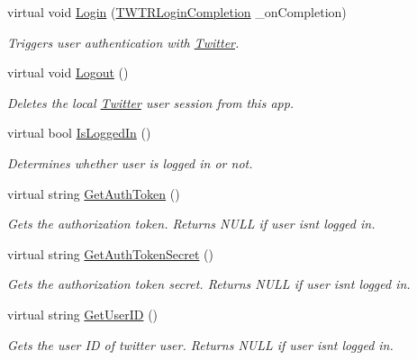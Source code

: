 \begin{DoxyCompactItemize}
\item 
virtual void \hyperlink{class_voxel_busters_1_1_native_plugins_1_1_twitter_a9949714add72302695128d30d824f7a7}{Login} (\hyperlink{class_voxel_busters_1_1_native_plugins_1_1_twitter_a34f959f59508d1442e3d921bbfe45cd5}{T\+W\+T\+R\+Login\+Completion} \+\_\+on\+Completion)
\begin{DoxyCompactList}\small\item\em Triggers user authentication with \hyperlink{class_voxel_busters_1_1_native_plugins_1_1_twitter}{Twitter}. \end{DoxyCompactList}\item 
virtual void \hyperlink{class_voxel_busters_1_1_native_plugins_1_1_twitter_a49f9678ea9f85d72d78bdd288d989d8e}{Logout} ()
\begin{DoxyCompactList}\small\item\em Deletes the local \hyperlink{class_voxel_busters_1_1_native_plugins_1_1_twitter}{Twitter} user session from this app. \end{DoxyCompactList}\item 
virtual bool \hyperlink{class_voxel_busters_1_1_native_plugins_1_1_twitter_aefcb0d34ecb87897b685fc737f64b68c}{Is\+Logged\+In} ()
\begin{DoxyCompactList}\small\item\em Determines whether user is logged in or not. \end{DoxyCompactList}\item 
virtual string \hyperlink{class_voxel_busters_1_1_native_plugins_1_1_twitter_af1adce748fac02f3ccaea0ee1f104e6c}{Get\+Auth\+Token} ()
\begin{DoxyCompactList}\small\item\em Gets the authorization token. Returns N\+U\+L\+L if user isnt logged in. \end{DoxyCompactList}\item 
virtual string \hyperlink{class_voxel_busters_1_1_native_plugins_1_1_twitter_a4f0e464281e402f2aeecdf542ec1cb68}{Get\+Auth\+Token\+Secret} ()
\begin{DoxyCompactList}\small\item\em Gets the authorization token secret. Returns N\+U\+L\+L if user isnt logged in. \end{DoxyCompactList}\item 
virtual string \hyperlink{class_voxel_busters_1_1_native_plugins_1_1_twitter_ade45ff64f7c0b82b94219df5767db8f5}{Get\+User\+I\+D} ()
\begin{DoxyCompactList}\small\item\em Gets the user I\+D of twitter user. Returns N\+U\+L\+L if user isnt logged in. \end{DoxyCompactList}\item 

\end{DoxyCompactItemize}
